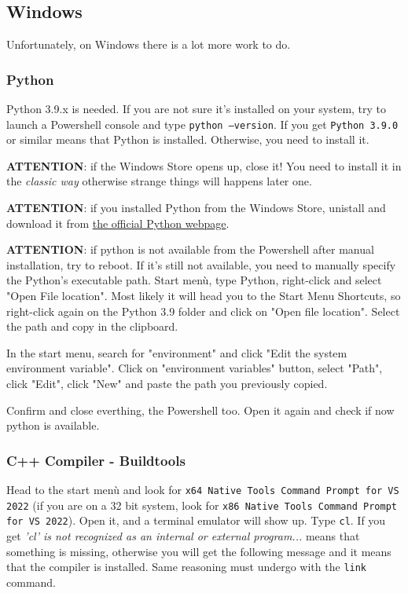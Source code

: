 \subsection{Windows}
Unfortunately, on Windows there is a lot more work to do.

\subsubsection{Python}
Python 3.9.x is needed. If you are not sure it's installed on your system, try to launch a Powershell console and type \texttt{python --version}. If you get \texttt{Python 3.9.0} or similar means that Python is installed. Otherwise, you need to install it. \\

\begin{warning}
\textbf{ATTENTION}: if the Windows Store opens up, close it! You need to install it in the \textit{classic way} otherwise strange things will happens later one. 
\end{warning}

\begin{warning}
\textbf{ATTENTION}: if you installed Python from the Windows Store, unistall and download it from \href{https://www.python.org/downloads/release/python-390/}{the official Python webpage}.
\end{warning}

\begin{warning}
	\textbf{ATTENTION}: if python is not available from the Powershell after manual installation, try to reboot. If it's still not available, you need to manually specify the Python's executable path. Start menù, type Python, right-click and select "Open File location". Most likely it will head you to the Start Menu Shortcuts, so right-click again on the Python 3.9 folder and click on "Open file location". Select the path and copy in the clipboard.

	In the start menu, search for "environment" and click "Edit the system environment variable". Click on "environment variables" button, select "Path", click "Edit", click "New" and paste the path you previously copied.

	Confirm and close everthing, the Powershell too. Open it again and check if now python is available.
\end{warning}

\subsubsection{C++ Compiler - Buildtools}
Head to the start menù and look for \texttt{x64 Native Tools Command Prompt for VS 2022} (if you are on a 32 bit system, look for \texttt{x86 Native Tools Command Prompt for VS 2022}). Open it, and a terminal emulator will show up. Type \texttt{cl}. If you get \textit{'cl' is not recognized as an internal or external program...} means that something is missing, otherwise you will get the following message and it means that the compiler is installed. Same reasoning must undergo with the \texttt{link} command.


